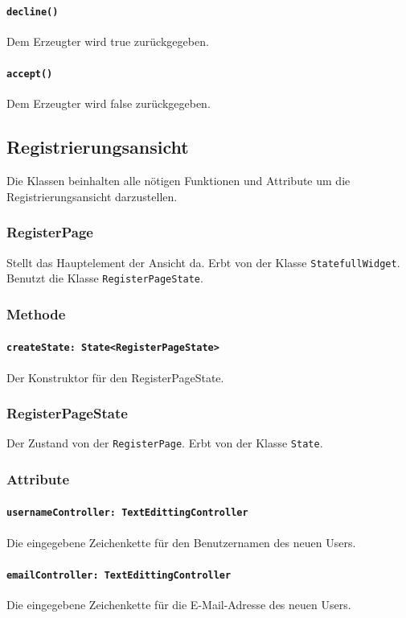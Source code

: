 \documentclass[parskip=full]{scrartcl}
\begin{document}
            \paragraph*{\texttt{decline()}} Dem Erzeugter wird true zurückgegeben.
            \paragraph*{\texttt{accept()}} Dem Erzeugter wird false zurückgegeben.

\subsection{Registrierungsansicht}
    Die Klassen beinhalten alle nötigen Funktionen und Attribute um die Registrierungsansicht darzustellen.

    \subsubsection{RegisterPage}
        Stellt das Hauptelement der Ansicht da. Erbt von der Klasse \texttt{StatefullWidget}. Benutzt die Klasse \texttt{RegisterPageState}.
        \subsubsection*{Methode}
            \paragraph*{\texttt{createState: State<RegisterPageState>}} Der Konstruktor für den RegisterPageState.
    
    \subsubsection{RegisterPageState}
        Der Zustand von der \texttt{RegisterPage}. Erbt von der Klasse \texttt{State}.
        \subsubsection*{Attribute}
            \paragraph*{\texttt{usernameController: TextEdittingController}} Die eingegebene Zeichenkette für den Benutzernamen des neuen Users.
            \paragraph*{\texttt{emailController: TextEdittingController}} Die eingegebene Zeichenkette für die E-Mail-Adresse des neuen Users.
\end{document}
